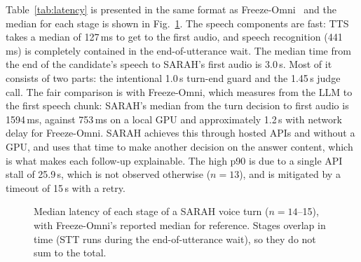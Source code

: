 \documentclass[conference]{IEEEtran}
\begin{document}
Table~\ref{tab:latency} is presented in the same format as Freeze-Omni~\cite{freezeomni} and the median for each stage is shown in Fig.~\ref{fig:latency}. The speech components are fast: TTS takes a median of 127\,ms to get to the first audio, and speech recognition (441\,ms) is completely contained in the end-of-utterance wait. The median time from the end of the candidate's speech to SARAH's first audio is 3.0\,s. Most of it consists of two parts: the intentional 1.0\,s turn-end guard and the 1.45\,s judge call. The fair comparison is with Freeze-Omni, which measures from the LLM to the first speech chunk: SARAH's median from the turn decision to first audio is 1594\,ms, against 753\,ms on a local GPU and approximately 1.2\,s with network delay for Freeze-Omni. SARAH achieves this through hosted APIs and without a GPU, and uses that time to make another decision on the answer content, which is what makes each follow-up explainable. The high p90 is due to a single API stall of 25.9\,s, which is not observed otherwise ($n = 13$), and is mitigated by a timeout of 15\,s with a retry.


\begin{figure}[t]
\centering
{}
\caption{Median latency of each stage of a SARAH voice turn ($n=14$--15), with Freeze-Omni's reported median for reference. Stages overlap in time (STT runs during the end-of-utterance wait), so they do not sum to the total.}
\label{fig:latency}
\end{figure}
\end{document}
